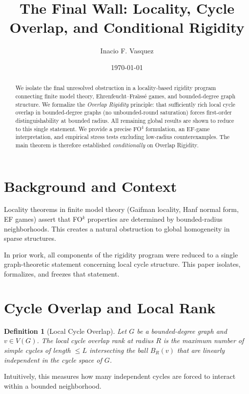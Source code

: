 \documentclass[11pt]{article}
\title{The Final Wall: Locality, Cycle Overlap, and Conditional Rigidity}
\author{Inacio F. Vasquez}
\date{\today}
\newtheorem{definition}{Definition}
\begin{document}
\maketitle

\begin{abstract}
We isolate the final unresolved obstruction in a locality-based rigidity program
connecting finite model theory, Ehrenfeucht--Fra\"{\i}ss\'{e} games, and bounded-degree graph
structure. We formalize the \emph{Overlap Rigidity} principle: that sufficiently rich
local cycle overlap in bounded-degree graphs (no unbounded-round saturation) forces first-order distinguishability at
bounded radius. All remaining global results are shown to reduce to this single statement.
We provide a precise FO$^4$ formulation, an EF-game interpretation, and empirical stress
tests excluding low-radius counterexamples. The main theorem is therefore established
\emph{conditionally} on Overlap Rigidity.
\end{abstract}

\section{Background and Context}

Locality theorems in finite model theory (Gaifman locality, Hanf normal form, EF games)
assert that FO$^k$ properties are determined by bounded-radius neighborhoods.
This creates a natural obstruction to global homogeneity in sparse structures.

In prior work, all components of the rigidity program were reduced to a single
graph-theoretic statement concerning local cycle structure. This paper isolates,
formalizes, and freezes that statement.

\section{Cycle Overlap and Local Rank}

\begin{definition}[Local Cycle Overlap]
Let $G$ be a bounded-degree graph and $v \in V(G)$. The \emph{local cycle overlap rank}
at radius $R$ is the maximum number of simple cycles of length $\le L$ intersecting
the ball $B_R(v)$ that are linearly independent in the cycle space of $G$.
\end{definition}

Intuitively, this measures how many independent cycles are forced to interact
within a bounded neighborhood.
\end{document}
